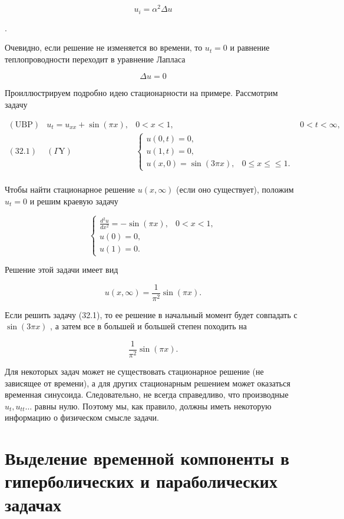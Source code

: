 \documentclass[
  ukrainian,
]{article}
\begin{document}
\[
u_i = \alpha^2 \Delta u
\]

.

Очевидно, если решение не изменяется во времени, то \(u_t = 0\) и
равнение теплопроводности переходит в уравнение Лапласа

\[
\Delta u = 0
\]

Проиллюстрируем подробно идею стационарности на примере. Рассмотрим
задачу

\[
\begin{array}{ll} (\text{UBP}) & u_t = u_{xx} + \sin{(\pi x)}, & 0 < x < 1, & 0 < t < \infty, \\ (32.1) & (\Gamma \text{Y}) & \begin{cases} u(0, t) = 0, \\ u(1, t) = 0, \\ u(x, 0) = \sin{(3\pi x)}, & 0 \le x \le \le 1. \end{cases} \\ \end{array}
\]

Чтобы найти стационарное решение \(u\left(x,\infty\right)\) (если оно
существует), положим \(u_{t}\!=\!0\) и решим краевую задачу

\[
\begin{cases} \frac{d^{2}u}{dx^{2}} = -\sin(\pi x), & 0 < x < 1, \\ u(0) = 0, \\ u(1) = 0. \end{cases}
\]

Решение этой задачи имеет вид

\[
u(x, \infty) = \frac{1}{\pi^2} \sin{(\pi x)}.
\]

Если решить задачу (32.1), то ее решение в начальный момент будет
совпадать с \(\sin{(3\pi x)}\) , а затем все в большей и большей степен
походить на

\[
\frac{1}{\pi^2}\sin{(\pi x)}.
\]

Для некоторых задач может не существовать стационарное решение (не
зависящее от времени), а для других стационарным решением может
оказаться временная синусоида. Следовательно, не всегда справедливо, что
производные \(u_t, u_{tt} \dots\) равны нулю. Поэтому мы, как правило,
должны иметь некоторую информацию о физическом смысле задачи.

\section{Выделение временной компоненты в гиперболических и
параболических
задачах}\label{ux432ux44bux434ux435ux43bux435ux43dux438ux435-ux432ux440ux435ux43cux435ux43dux43dux43eux439-ux43aux43eux43cux43fux43eux43dux435ux43dux442ux44b-ux432-ux433ux438ux43fux435ux440ux431ux43eux43bux438ux447ux435ux441ux43aux438ux445-ux438-ux43fux430ux440ux430ux431ux43eux43bux438ux447ux435ux441ux43aux438ux445-ux437ux430ux434ux430ux447ux430ux445}
\end{document}
